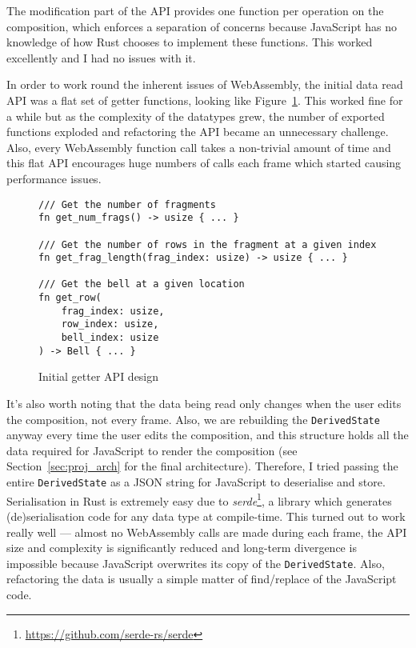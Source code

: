 \documentclass[12pt]{article}
\newcommand{\footurl}[1]{\footnote{\url{#1}}}
\begin{document}
The modification part of the API provides one function per operation on the composition, which
enforces a separation of concerns because JavaScript has no knowledge of how Rust chooses to
implement these functions.  This worked excellently and I had no issues with it.

In order to work round the inherent issues of WebAssembly, the initial data read API was a flat set
of getter functions, looking like Figure~\ref{fig:initial_api}.  This worked fine for a while but as
the complexity of the datatypes grew, the number of exported functions exploded and refactoring the
API became an unnecessary challenge.  Also, every WebAssembly function call takes a non-trivial
amount of time and this flat API encourages huge numbers of calls each frame which started causing
performance issues.

\begin{figure}
    \begin{verbatim}
/// Get the number of fragments
fn get_num_frags() -> usize { ... }

/// Get the number of rows in the fragment at a given index
fn get_frag_length(frag_index: usize) -> usize { ... }

/// Get the bell at a given location
fn get_row(
    frag_index: usize,
    row_index: usize,
    bell_index: usize
) -> Bell { ... }
    \end{verbatim}
    \caption{Initial getter API design}\label{fig:initial_api}
\end{figure}

It's also worth noting that the data being read only changes when the user edits the composition,
not every frame.  Also, we are rebuilding the \verb|DerivedState| anyway every time the user edits
the composition, and this structure holds all the data required for JavaScript to render the
composition (see Section~\ref{sec:proj_arch} for the final architecture).  Therefore, I tried
passing the entire \verb|DerivedState| as a JSON string for JavaScript to deserialise and store.
Serialisation in Rust is extremely easy due to
\emph{serde}\footurl{https://github.com/serde-rs/serde}, a library which generates
(de)serialisation code for any data type at compile-time.  This turned out to work really well ---
almost no WebAssembly calls are made during each frame, the API size and complexity is significantly
reduced and long-term divergence is impossible because JavaScript overwrites its copy of the
\verb|DerivedState|.  Also, refactoring the data is usually a simple matter of find/replace of the
JavaScript code.  
\end{document}
